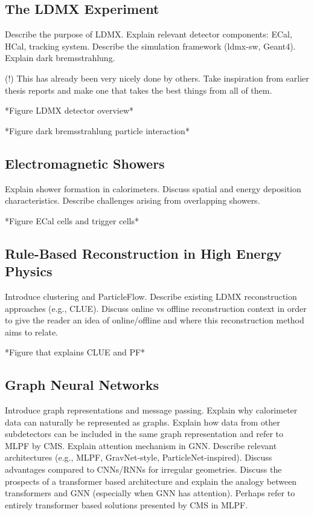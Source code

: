 \subsection{The LDMX Experiment}
Describe the purpose of LDMX.
Explain relevant detector components: ECal, HCal, tracking system.
Describe the simulation framework (ldmx-sw, Geant4). Explain dark bremsstrahlung.

(!) This has already been very nicely done by others. Take inspiration from earlier thesis reports and make one that takes the best things from all of them.

*Figure LDMX detector overview*

*Figure dark bremsstrahlung particle interaction*

\subsection{Electromagnetic Showers}
Explain shower formation in calorimeters.
Discuss spatial and energy deposition characteristics.
Describe challenges arising from overlapping showers.

*Figure ECal cells and trigger cells*

\subsection{Rule-Based Reconstruction in High Energy Physics}
Introduce clustering and ParticleFlow.
Describe existing LDMX reconstruction approaches (e.g., CLUE).
Discuss online vs offline reconstruction context in order to give the reader an idea of online/offline and where this reconstruction method aims to relate.

*Figure that explains CLUE and PF*


\subsection{Graph Neural Networks}
Introduce graph representations and message passing.
Explain why calorimeter data can naturally be represented as graphs. Explain how data from other subdetectors can be included in the same graph representation and refer to MLPF by CMS.
Explain attention mechanism in GNN.
Describe relevant architectures (e.g., MLPF, GravNet-style, ParticleNet-inspired).
Discuss advantages compared to CNNs/RNNs for irregular geometries.
Discuss the prospects of a transformer based architecture and explain the analogy between transformers and GNN (especially when GNN has attention). Perhaps refer to entirely transformer based solutions presented by CMS in MLPF. 


